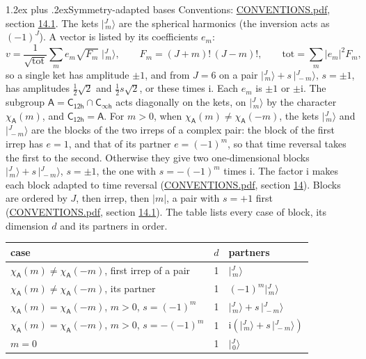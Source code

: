 \documentclass[10pt,a4paper]{article}
\makeatletter
\renewcommand\section{\@startsection{section}{1}{\z@}{-3ex plus -1ex minus -.2ex}%
  {1.2ex plus .2ex}{\normalfont\large\sffamily\bfseries\color{parttitle}}}
\numberwithin{equation}{section}
\newcommand{\grp}[1]{\mathsf{#1}}
\newcommand{\iunit}{\mathrm{i}}
\newcommand{\chiA}{\chi_{\grp{A}}}
\newcommand{\jm}[2]{\bigl\lvert{}^{#1}_{\,#2}\bigr\rangle}
\makeatother
\begin{document}
\section{Symmetry-adapted bases}\label{s:bases}
Conventions: \href{../../CONVENTIONS.pdf}{CONVENTIONS.pdf}, section \href{../../CONVENTIONS.pdf\#conv.14.1}{14.1}.
\leavevmode\label{n:index.m}\label{n:vector.ket}The kets $\jm{J}{m}$ are the spherical harmonics (the inversion acts as $(-1)^J$). \label{n:index.ketcoefficient}\label{n:vector.basis.symmetry}\label{n:index.ketweight}\label{n:index.total}A vector is listed by its coefficients $e_m$:
\begin{equation}\label{e:ket}v = \frac{1}{\sqrt{\mathrm{tot}}}\sum_m e_m\sqrt{F_m}\;\jm{J}{m},\qquad F_m = (J+m)!\,(J-m)!,\qquad \mathrm{tot} = \sum_m |e_m|^2F_m,\end{equation}
\leavevmode\label{n:index.pair.sign}so a single ket has amplitude $\pm1$, and from $J = 6$ on a pair $\jm{J}{m} + s\,\jm{J}{-m}$, $s = \pm1$, has amplitudes $\tfrac{1}{2}\sqrt{2}$ and $\tfrac{1}{2}s\sqrt{2}$, or these times $\iunit$. Each $e_m$ is $\pm1$ or $\pm\iunit$.
\leavevmode\label{n:group.A}\label{n:function.character.abelian}The subgroup $\grp{A} = \grp{C_{12h}}\cap\grp{C_{\infty h}}$ acts diagonally on the kets, on $\jm{J}{m}$ by the character $\chiA(m)$, and $\grp{C_{12h}} = \grp{A}$. For $m > 0$, when $\chiA(m) \ne \chiA(-m)$, the kets $\jm{J}{m}$ and $\jm{J}{-m}$ are the blocks of the two irreps of a complex pair: the block of the first irrep has $e = 1$, and that of its partner $e = (-1)^m$, so that time reversal takes the first to the second. Otherwise they give two one-dimensional blocks $\jm{J}{m} + s\,\jm{J}{-m}$, $s = \pm1$, the one with $s = -(-1)^m$ times $\iunit$. The factor $\iunit$ makes each block adapted to time reversal (\href{../../CONVENTIONS.pdf}{CONVENTIONS.pdf}, section \href{../../CONVENTIONS.pdf\#conv.14}{14}). Blocks are ordered by $J$, then irrep, then $|m|$, a pair with $s = +1$ first (\href{../../CONVENTIONS.pdf}{CONVENTIONS.pdf}, section \href{../../CONVENTIONS.pdf\#conv.14.1}{14.1}).
\leavevmode\label{n:head.case}\label{n:head.partners}The table lists every case of block, its dimension $d$ and its partners in order.
\begin{center}\begin{tabular}{@{}lrl@{}}\toprule
case & $d$ & partners\\\midrule
$\chiA(m) \ne \chiA(-m)$, first irrep of a pair & 1 & $\jm{J}{m}$\\
$\chiA(m) \ne \chiA(-m)$, its partner & 1 & $(-1)^m\jm{J}{m}$\\
$\chiA(m) = \chiA(-m)$, $m > 0$, $s = (-1)^m$ & 1 & $\jm{J}{m} + s\,\jm{J}{-m}$\\
$\chiA(m) = \chiA(-m)$, $m > 0$, $s = -(-1)^m$ & 1 & $\iunit(\jm{J}{m} + s\,\jm{J}{-m})$\\
$m = 0$ & 1 & $\jm{J}{0}$\\
\bottomrule\end{tabular}\end{center}
\end{document}
